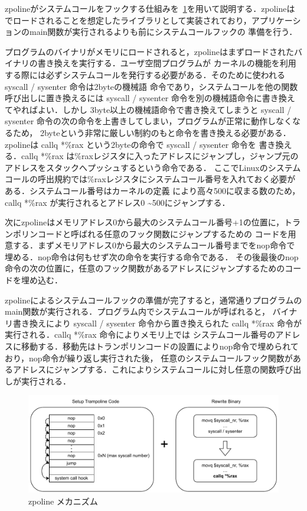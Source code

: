 \documentclass[a4paper,11pt]{jreport}
\begin{document}
zpolineがシステムコールをフックする仕組みを\figurename~\ref{fig:Zpoline mechanism}を用いて説明する．zpolineは
でロードされることを想定したライブラリとして実装されており，アプリケーションのmain関数が実行されるよりも前にシステムコールフックの
準備を行う．

プログラムのバイナリがメモリにロードされると，zpolineはまずロードされたバイナリの書き換えを実行する．ユーザ空間プログラムが
カーネルの機能を利用する際には必ずシステムコールを発行する必要がある．そのために使われる syscall / sysenter 命令は2byteの機械語
命令であり，システムコールを他の関数呼び出しに置き換えるには syscall / sysenter 命令を別の機械語命令に書き換えてやればよい．しかし
3byte以上の機械語命令で書き換えてしまうと syscall / sysenter 命令の次の命令を上書きしてしまい，プログラムが正常に動作しなくなるため，
2byteという非常に厳しい制約のもと命令を書き換える必要がある．zpolineは callq *\%rax という2byteの命令で syscall / sysenter 命令を
書き換える．callq *\%rax は\%raxレジスタに入ったアドレスにジャンプし，ジャンプ元のアドレスをスタックへプッシュするという命令である．
ここでLinuxのシステムコールの呼出規約では\%raxレジスタにシステムコール番号を入れておく必要がある．システムコール番号はカーネルの定義
により高々500に収まる数のため，callq *\%rax が実行されるとアドレス0 \textasciitilde 500にジャンプする．

次にzpolineはメモリアドレス0から最大のシステムコール番号+1の位置に，トランポリンコードと呼ばれる任意のフック関数にジャンプするための
コードを用意する．まずメモリアドレス0から最大のシステムコール番号までをnop命令で埋める．nop命令は何もせず次の命令を実行する命令である．
その後最後のnop命令の次の位置に，任意のフック関数があるアドレスにジャンプするためのコードを埋め込む．

zpolineによるシステムコールフックの準備が完了すると，通常通りプログラムのmain関数が実行される．プログラム内でシステムコールが呼ばれると，
バイナリ書き換えにより syscall / sysenter 命令から置き換えられた callq *\%rax 命令が実行される．callq *\%rax 命令によりメモリ上では
システムコール番号のアドレスに移動する．移動先はトランポリンコードの設置によりnop命令で埋められており，nop命令が繰り返し実行された後，
任意のシステムコールフック関数があるアドレスにジャンプする．これによりシステムコールに対し任意の関数呼び出しが実行される．


\begin{figure}[h]
	\begin{minipage}[b]{1\columnwidth}
		\centering
		\includegraphics[width=0.9\linewidth]{./figure/zpoline_mechanism.pdf}
		\caption{zpoline メカニズム}
		\label{fig:Zpoline mechanism}
	\end{minipage}
\end{figure}
\end{document}
